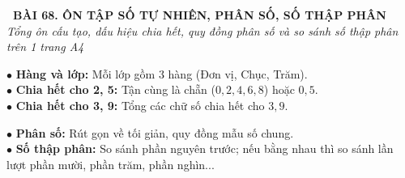 \documentclass[14pt,a4paper,oneside]{extbook}
\begin{document}
\noindent
\begin{tcolorbox}[
  enhanced,
  colback=teal!8!white,
  colframe=teal!80!black,
  arc=3mm,
  boxrule=1.1pt,
  width=\linewidth,
  halign=center,
  top=2.2mm, bottom=2.2mm,
  left=3mm, right=3mm,
  drop fuzzy shadow
]
  {\large\bfseries\color{teal!95!black}\faBookmark\ BÀI 68. ÔN TẬP SỐ TỰ NHIÊN, PHÂN SỐ, SỐ THẬP PHÂN}\\[2pt]
  {\scriptsize\color{black!75}\itshape Tổng ôn cấu tạo, dấu hiệu chia hết, quy đồng phân số và so sánh số thập phân trên 1 trang A4}
\end{tcolorbox}

\vspace{3.2mm}
\noindent
\begin{minipage}[t]{0.52\textwidth}
  \begin{tcolorbox}[
    enhanced,
    title={\footnotesize\bfseries\color{white}\faHashtag\ 1. Số tự nhiên \& Dấu hiệu chia hết},
    colback=blue!2!white,
    colframe=blue!75!black,
    arc=2.5mm, boxrule=0.8pt, top=1.8mm, bottom=1.8mm, left=2.2mm, right=2.2mm
  ]
    \footnotesize
    $\bullet$ \textbf{Hàng và lớp:} Mỗi lớp gồm $3$ hàng (Đơn vị, Chục, Trăm).\\
    $\bullet$ \textbf{Chia hết cho 2, 5:} Tận cùng là chẵn ($0, 2, 4, 6, 8$) hoặc $0, 5$.\\
    $\bullet$ \textbf{Chia hết cho 3, 9:} Tổng các chữ số chia hết cho $3, 9$.
  \end{tcolorbox}
\end{minipage}%
\hfill
\begin{minipage}[t]{0.46\textwidth}
  \begin{tcolorbox}[
    enhanced,
    title={\footnotesize\bfseries\color{white}\faSliders\ 2. Phân số \& Số thập phân},
    colback=teal!2!white,
    colframe=teal!75!black,
    arc=2.5mm, boxrule=0.8pt, top=1.8mm, bottom=1.8mm, left=2mm, right=2mm
  ]
    \footnotesize
    $\bullet$ \textbf{Phân số:} Rút gọn về tối giản, quy đồng mẫu số chung.\\
    $\bullet$ \textbf{Số thập phân:} So sánh phần nguyên trước; nếu bằng nhau thì so sánh lần lượt phần mười, phần trăm, phần nghìn...
  \end{tcolorbox}
\end{minipage}

\vspace{3mm}
\end{document}
